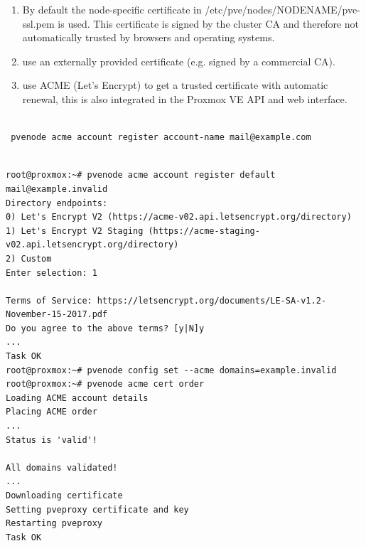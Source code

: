 \begin{enumerate}[leftmargin=2cm]

	\item By default the node-specific certificate in /etc/pve/nodes/NODENAME/pve-ssl.pem is used. This certificate is signed by the cluster CA and therefore not automatically trusted by browsers and operating systems.

	\item use an externally provided certificate (e.g. signed by a commercial CA).

	\item use ACME (Let’s Encrypt) to get a trusted certificate with automatic renewal, this is also integrated in the Proxmox VE API and web interface.

\end{enumerate}

\begin{lstlisting}

 pvenode acme account register account-name mail@example.com

\end{lstlisting}

\begin{lstlisting}

root@proxmox:~# pvenode acme account register default mail@example.invalid
Directory endpoints:
0) Let's Encrypt V2 (https://acme-v02.api.letsencrypt.org/directory)
1) Let's Encrypt V2 Staging (https://acme-staging-v02.api.letsencrypt.org/directory)
2) Custom
Enter selection: 1

Terms of Service: https://letsencrypt.org/documents/LE-SA-v1.2-November-15-2017.pdf
Do you agree to the above terms? [y|N]y
...
Task OK
root@proxmox:~# pvenode config set --acme domains=example.invalid
root@proxmox:~# pvenode acme cert order
Loading ACME account details
Placing ACME order
...
Status is 'valid'!

All domains validated!
...
Downloading certificate
Setting pveproxy certificate and key
Restarting pveproxy
Task OK

\end{lstlisting}

